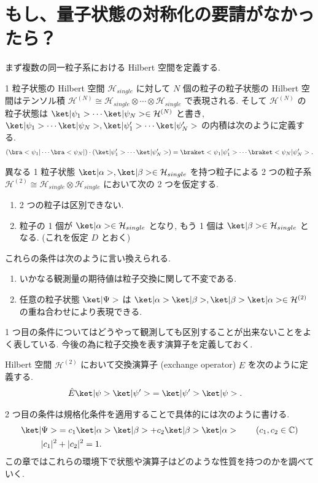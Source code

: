 \documentclass[uplatex,dvipdfmx,a4paper,11pt]{jlreq}
\newcommand{\CC}{\mathbb{C}}
\newcommand{\HH}{\mathcal{H}}
\numberwithin{equation}{section}
\theoremstyle{definition}
\begin{document}
\section{もし、量子状態の対称化の要請がなかったら？}
まず複数の同一粒子系における Hilbert 空間を定義する.
\begin{definition}
  1 粒子状態の Hilbert 空間 $\HH_{single}$ に対して $N$ 個の粒子の粒子状態の Hilbert 空間はテンソル積 $\HH^{(N)}\cong\HH_{single}\otimes\cdots\otimes\HH_{single}$ で表現される.
  そして $\HH^{(N)}$ の粒子状態は $\ket|\psi_1>\cdots\ket|\psi_N> \in\HH^{(N)}$ と書き, $\ket|\psi_1>\cdots\ket|\psi_N>, \ket|\psi_1'>\cdots\ket|\psi_N'>$ の内積は次のように定義する.
  \begin{align}
    (\bra<\psi_1|\cdots\bra<\psi_N|)\cdot(\ket|\psi_1'>\cdots\ket|\psi_N'>) = \braket<\psi_1|\psi_1'>\cdots\braket<\psi_N|\psi_N'>.
  \end{align}
\end{definition}
異なる 1 粒子状態 $\ket|\alpha>,\ket|\beta>\in\HH_{single}$ を持つ粒子による 2 つの粒子系 $\HH^{(2)} \cong \HH_{single}\otimes\HH_{single}$ において次の 2 つを仮定する.
\begin{enumerate}
  \item 2 つの粒子は区別できない.
  \item 粒子の 1 個が $\ket|\alpha>\in\HH_{single}$ となり, もう 1 個は $\ket|\beta>\in\HH_{single}$ となる. (これを仮定 $D$ とおく)
\end{enumerate}
これらの条件は次のように言い換えられる.
\begin{enumerate}
  \item いかなる観測量の期待値は粒子交換に関して不変である.
  \item 任意の粒子状態 $\ket|\Psi>$ は $\ket|\alpha>\ket|\beta>, \ket|\beta>\ket|\alpha>\in\HH^{(2)}$ の重ね合わせにより表現できる.
\end{enumerate}
1 つ目の条件についてはどうやって観測しても区別することが出来ないことをよく表している. 今後の為に粒子交換を表す演算子を定義しておく.
\begin{definition}[交換演算子]
  Hilbert 空間 $\HH^{(2)}$ において交換演算子 (exchange operator) $\hat{E}$ を次のように定義する.
  \begin{align}
    \hat{E}\ket|\psi>\ket|\psi'> & = \ket|\psi'>\ket|\psi>.
  \end{align}
\end{definition}
2 つ目の条件は規格化条件を適用することで具体的には次のように書ける.
\begin{align}
  \ket|\Psi> & = c_1\ket|\alpha>\ket|\beta> + c_2\ket|\beta>\ket|\alpha> \qquad (c_1, c_2\in\CC) \\
  |c_1|^2    & + |c_2|^2 = 1.
\end{align}
この章ではこれらの環境下で状態や演算子はどのような性質を持つのかを調べていく.
\end{document}

